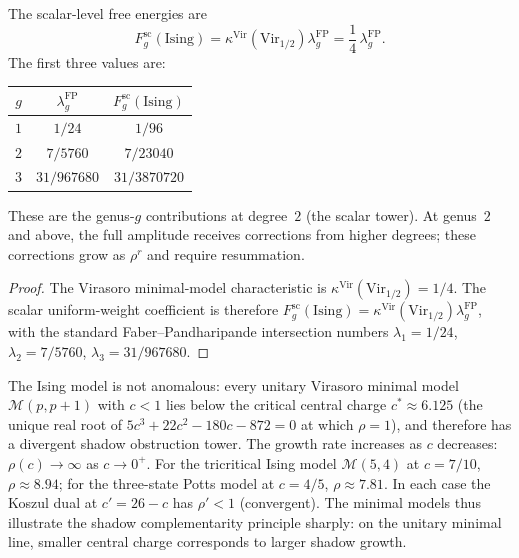 \begin{proposition}%
\label{prop:ising-free-energies}
The scalar-level free energies are
\[
F_g^{\mathrm{sc}}(\mathrm{Ising})
=\kappa^{\mathrm{Vir}}(\mathrm{Vir}_{1/2})
 \lambda_g^{\mathrm{FP}}
=\frac14\,\lambda_g^{\mathrm{FP}}.
\]
The first three values are:
\begin{center}
\renewcommand{\arraystretch}{1.2}
\begin{tabular}{ccc}
\toprule
$g$ & $\lambda_g^{\mathrm{FP}}$ & $F_g^{\mathrm{sc}}(\mathrm{Ising})$ \\
\midrule
$1$ & $1/24$ & $1/96$ \\
$2$ & $7/5760$ & $7/23040$ \\
$3$ & $31/967680$ & $31/3870720$ \\
\bottomrule
\end{tabular}
\end{center}
These are the genus-$g$ contributions at degree~$2$
\textup{(}the scalar tower\textup{)}. At genus~$2$ and above,
the full amplitude receives corrections from higher degrees;
these corrections grow as $\rho^r$ and require resummation.
\end{proposition}

\begin{proof}
The Virasoro minimal-model characteristic is
\(\kappa^{\mathrm{Vir}}(\mathrm{Vir}_{1/2})=1/4\). The scalar
uniform-weight coefficient is therefore
\(F_g^{\mathrm{sc}}(\mathrm{Ising})
=\kappa^{\mathrm{Vir}}(\mathrm{Vir}_{1/2})\lambda_g^{\mathrm{FP}}\),
with the standard Faber--Pandharipande intersection numbers
$\lambda_1 = 1/24$, $\lambda_2 = 7/5760$,
$\lambda_3 = 31/967680$.
\end{proof}

\begin{remark}%
\label{rem:minimal-model-shadow-regime}
The Ising model is not anomalous: every unitary Virasoro minimal model
$\mathcal{M}(p, p+1)$ with $c < 1$ lies below the critical central
charge $c^* \approx 6.125$ (the unique real root of
$5c^3 + 22c^2 - 180c - 872 = 0$ at which $\rho = 1$), and therefore
has a divergent shadow obstruction tower. The growth rate increases as $c$
decreases: $\rho(c) \to \infty$ as $c \to 0^+$. For
the tricritical Ising model $\mathcal{M}(5,4)$ at $c = 7/10$,
$\rho \approx 8.94$; for the three-state Potts model at $c = 4/5$,
$\rho \approx 7.81$. In each case the Koszul dual at $c' = 26 - c$
has $\rho' < 1$ (convergent). The minimal models thus illustrate
the shadow complementarity principle sharply: on the unitary minimal
line, smaller central charge corresponds to larger shadow growth.
\end{remark}
